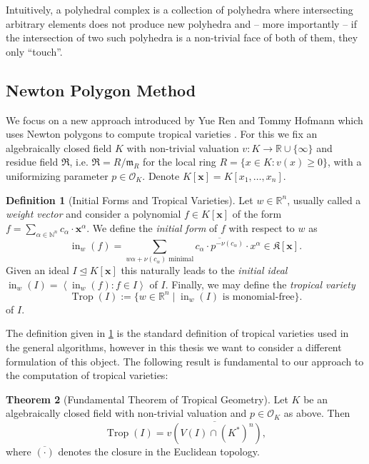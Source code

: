 \documentclass[
  paper=a4,
  DIV=14,
  fontsize=12pt,
  titlepage,
  bibliography=totoc,
  listof=totoc,
  pagesize=pdftex
]{scrartcl}
\numberwithin{figure}{section}
\numberwithin{equation}{section}
\numberwithin{table}{section}
\newcommand*\setR{\mathds{R}}
\newcommand*\setN{\mathds{N}}
\newcommand*\ideal[1]{\left\langle #1 \right\rangle}
\let\vec\mathbf
\let\idealof\trianglelefteq
\DeclareMathOperator{\Trop}{Trop}
\DeclareMathOperator{\initial}{in}
\theoremstyle{definition}
\newtheorem{definition}{Definition}
\newtheorem{theorem}[definition]{Theorem}
\numberwithin{definition}{section}
\begin{document}
Intuitively, a polyhedral complex is a collection of polyhedra where intersecting
arbitrary elements does not produce new polyhedra and -- more importantly -- if the
intersection of two such polyhedra is a non-trivial face of both of them, they only
\enquote{touch}.


\subsection{Newton Polygon Method}

We focus on a new approach introduced by Yue Ren and Tommy Hofmann which uses Newton
polygons to compute tropical varieties \cite{tropPointsLinks}. For this we fix an
algebraically closed field $K$ with non-trivial valuation $v:K\to\setR \cup \{\infty\}$
and residue field $\mathfrak R$, i.e. $\mathfrak R = R/\mathfrak m_R$ for the local ring
$R = \{ x \in K : v(x) \geq 0 \}$, with a uniformizing parameter $p\in \mathcal O_K$.
Denote $K[\vec x] = K[x_1, \ldots, x_n]$.


\begin{definition}[Initial Forms and Tropical Varieties]
  Let $w \in \setR^n$, usually called a \emph{weight vector} and consider a polynomial $f
  \in K[\vec x]$ of the form $f = \sum_{\alpha \in \setN^n} c_\alpha \cdot \vec x^\alpha$.
  We define the \emph{initial form} of $f$ with respect to $w$ as
  \[
    \initial_w(f) = \sum_{w\alpha + \nu(c_\alpha) \text{ minimal}}
    \overline{c_\alpha \cdot p^{-\nu(c_\alpha)}} \cdot x^\alpha
    \in \mathfrak K[\vec x].
  \]
  Given an ideal $I \idealof K[\vec x]$ this naturally leads to the \emph{initial ideal}
  $\initial_w(I) = \ideal{\initial_w(f) : f\in I}$ of $I$. Finally, we may define the
  \emph{tropical variety}
  \[
    \Trop(I) := \{ w \in \setR^n \mid \initial_w(I) \text{ is monomial-free} \}.
  \]
  of $I$.
  \label{def:tropicalVarietyVal}
\end{definition}

The definition given in \ref{def:tropicalVarietyVal} is the standard definition of
tropical varieties used in the general algorithms, however in this thesis we want to
consider a different formulation of this object. The following result is fundamental to
our approach to the computation of tropical varieties:

\begin{theorem}[Fundamental Theorem of Tropical Geometry]
  Let $K$ be an algebraically closed field with non-trivial valuation and $p\in \mathcal
  O_K$ as above. Then
  \[
    \Trop(I) = \overline{v(V(I) \cap (K^\ast)^n)},
  \]
  where $\overline{(\cdot)}$ denotes the closure in the Euclidean topology.
  \label{thm:fundamentalThmTropicalGeometry}
\end{theorem}
\end{document}
